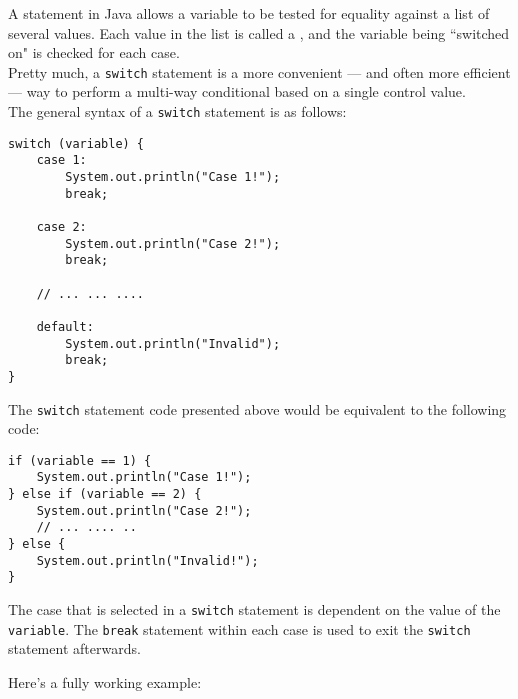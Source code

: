 A  statement in Java allows a variable to be tested for equality against a list of several values. Each value in the list is called a , and the variable being ``switched on" is checked for each case. \\

Pretty much, a \verb!switch! statement is a more convenient --- and often more efficient --- way to perform a multi-way conditional based on a single control value. \\

The general syntax of a \verb!switch! statement is as follows:


\begin{lstlisting}
switch (variable) {
    case 1:
        System.out.println("Case 1!");
        break;
    
    case 2:
        System.out.println("Case 2!");
        break;
        
    // ... ... ....
    
    default:
        System.out.println("Invalid");
        break;
}
\end{lstlisting}

The \verb!switch! statement code presented above would be equivalent to the following code:

\begin{lstlisting}
if (variable == 1) {
    System.out.println("Case 1!");
} else if (variable == 2) {
    System.out.println("Case 2!");
    // ... .... ..
} else {
    System.out.println("Invalid!");
}
\end{lstlisting}

The case that is selected in a \verb!switch! statement is dependent on the value of the \verb!variable!. The \verb!break! statement within each case is used to exit the \verb!switch! statement afterwards.


Here's a fully working example:

